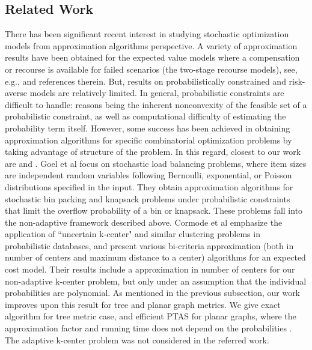 \documentclass[11pt,onecolumn]{article}
\begin{document}
\subsection{Related Work}
There has been significant recent interest in studying stochastic optimization models from approximation algorithms perspective. A variety of approximation results have been obtained for the expected value models where a compensation or recourse is available for failed scenarios (the two-stage recourse models), see, e.g., \cite{swamy-survey} and references therein. 
But, results on probabilistically constrained and risk-averse models are relatively limited. In general, probabilistic constraints are difficult to handle: reasons being the inherent nonconvexity of the feasible set of a probabilistic constraint, as well as computational difficulty of estimating the probability term itself. However, some success has been achieved in obtaining approximation algorithms for specific combinatorial optimization problems by taking advantage of structure of the problem. In this regard, closest to our work are \cite{goel99stochastic} and \cite{cormode-pods07}.  
Goel et al \cite{goel99stochastic} focus on stochastic load balancing problems,
where item sizes are independent random variables following Bernoulli, exponential, or Poisson distributions specified in the input. They obtain approximation algorithms for stochastic bin packing and knapsack problems under probabilistic constraints that limit the overflow probability of a bin or knapsack.  These problems fall into the non-adaptive framework described above. Cormode et al \cite{cormode-pods07} emphasize the application of ``uncertain k-center" and similar clustering problems in probabilistic databases, and present various bi-criteria approximation (both in number of centers and maximum distance to a center) algorithms for an expected cost model. Their results include a  approximation in number of centers for our non-adaptive k-center problem, but only under an assumption that the individual probabilities  are polynomial. As mentioned in the previous subsection, our work improves upon this result for tree and planar graph metrics. We give exact algorithm for tree metric case, and efficient PTAS for planar graphs, where the approximation factor and running time does not depend on the probabilities . The adaptive k-center problem was not considered in the referred work.
\end{document}
